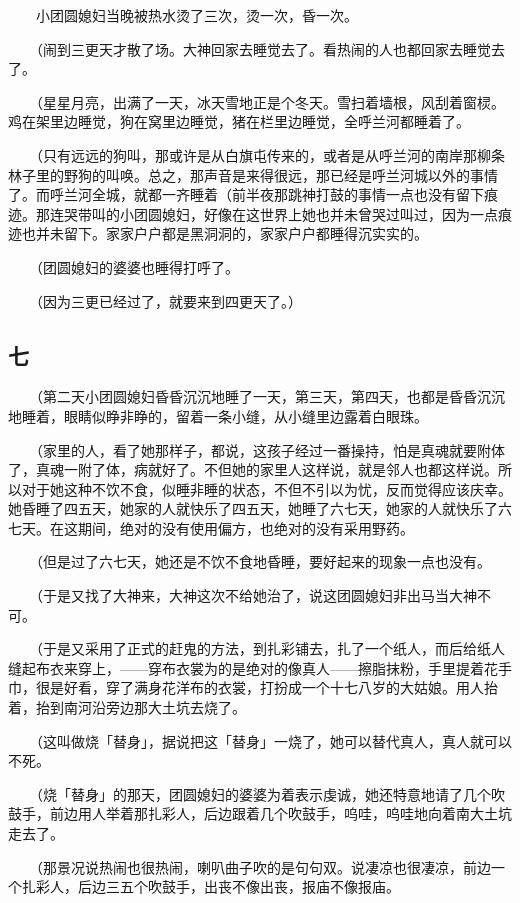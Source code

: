 \documentclass[UTF8]{ctexart}
\begin{document}
　　小团圆媳妇当晚被热水烫了三次，烫一次，昏一次。

　　（闹到三更天才散了场。大神回家去睡觉去了。看热闹的人也都回家去睡觉去了。

　　（星星月亮，出满了一天，冰天雪地正是个冬天。雪扫着墙根，风刮着窗棂。鸡在架里边睡觉，狗在窝里边睡觉，猪在栏里边睡觉，全呼兰河都睡着了。

　　（只有远远的狗叫，那或许是从白旗屯传来的，或者是从呼兰河的南岸那柳条林子里的野狗的叫唤。总之，那声音是来得很远，那已经是呼兰河城以外的事情了。而呼兰河全城，就都一齐睡着（前半夜那跳神打鼓的事情一点也没有留下痕迹。那连哭带叫的小团圆媳妇，好像在这世界上她也并未曾哭过叫过，因为一点痕迹也并未留下。家家户户都是黑洞洞的，家家户户都睡得沉实实的。

　　（团圆媳妇的婆婆也睡得打呼了。

　　（因为三更已经过了，就要来到四更天了。）

\subsection{七}

　　（第二天小团圆媳妇昏昏沉沉地睡了一天，第三天，第四天，也都是昏昏沉沉地睡着，眼睛似睁非睁的，留着一条小缝，从小缝里边露着白眼珠。

　　（家里的人，看了她那样子，都说，这孩子经过一番操持，怕是真魂就要附体了，真魂一附了体，病就好了。不但她的家里人这样说，就是邻人也都这样说。所以对于她这种不饮不食，似睡非睡的状态，不但不引以为忧，反而觉得应该庆幸。她昏睡了四五天，她家的人就快乐了四五天，她睡了六七天，她家的人就快乐了六七天。在这期间，绝对的没有使用偏方，也绝对的没有采用野药。

　　（但是过了六七天，她还是不饮不食地昏睡，要好起来的现象一点也没有。

　　（于是又找了大神来，大神这次不给她治了，说这团圆媳妇非出马当大神不可。

　　（于是又采用了正式的赶鬼的方法，到扎彩铺去，扎了一个纸人，而后给纸人缝起布衣来穿上，——穿布衣裳为的是绝对的像真人——擦脂抹粉，手里提着花手巾，很是好看，穿了满身花洋布的衣裳，打扮成一个十七八岁的大姑娘。用人抬着，抬到南河沿旁边那大土坑去烧了。

　　（这叫做烧「替身」，据说把这「替身」一烧了，她可以替代真人，真人就可以不死。

　　（烧「替身」的那天，团圆媳妇的婆婆为着表示虔诚，她还特意地请了几个吹鼓手，前边用人举着那扎彩人，后边跟着几个吹鼓手，呜哇，呜哇地向着南大土坑走去了。

　　（那景况说热闹也很热闹，喇叭曲子吹的是句句双。说凄凉也很凄凉，前边一个扎彩人，后边三五个吹鼓手，出丧不像出丧，报庙不像报庙。
\end{document}

